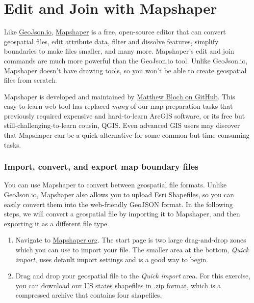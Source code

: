 \documentclass[
  english,
]{book}
\begin{document}
\hypertarget{mapshaper}{%
\section*{Edit and Join with Mapshaper}\label{mapshaper}}

Like \href{geojsonio.html}{GeoJson.io}, \href{https://mapshaper.org}{Mapshaper}
is a free, open-source editor that can convert geospatial files, edit attribute
data, filter and dissolve features, simplify boundaries to make files smaller,
and many more. Mapshaper's edit and join commands are much more powerful than the GeoJson.io tool. Unlike GeoJson.io, Mapshaper doesn't have drawing tools, so you won't be able to create geospatial files from scratch.

Mapshaper is developed and maintained by \href{https://github.com/mbloch/mapshaper}{Matthew Bloch on GitHub}.
This easy-to-learn web tool has replaced \emph{many} of our map preparation
tasks that previously required expensive and hard-to-learn ArcGIS software, or its free
but still-challenging-to-learn cousin, QGIS. Even advanced GIS users may discover that Mapshaper
can be a quick alternative for some common but time-consuming tasks.

\hypertarget{import-convert-and-export-map-boundary-files}{%
\subsubsection*{Import, convert, and export map boundary files}\label{import-convert-and-export-map-boundary-files}}

You can use Mapshaper to convert between geospatial file formats. Unlike GeoJson.io,
Mapshaper also allows you to upload Esri Shapefiles, so you can easily convert them into the web-friendly GeoJSON format.
In the following steps, we will convert a geospatial file by importing it to Mapshaper,
and then exporting it as a different file type.

\begin{enumerate}
\def\labelenumi{\arabic{enumi}.}
\item
  Navigate to \href{https://mapshaper.org}{Mapshaper.org}. The start page is two large drag-and-drop zones
  which you can use to import your file. The smaller area at the bottom, \emph{Quick import}, uses default
  import settings and is a good way to begin.
\item
  Drag and drop your geospatial file to the \emph{Quick import} area. For this exercise, you can download our \href{data/us-states-shapefile.zip}{US states shapefiles in .zip format}, which is a compressed archive that contains four shapefiles.
\end{enumerate}
\end{document}
